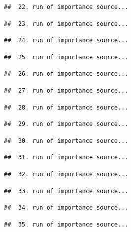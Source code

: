 \documentclass[
]{article}
\begin{document}
\begin{verbatim}
##  22. run of importance source...
\end{verbatim}

\begin{verbatim}
##  23. run of importance source...
\end{verbatim}

\begin{verbatim}
##  24. run of importance source...
\end{verbatim}

\begin{verbatim}
##  25. run of importance source...
\end{verbatim}

\begin{verbatim}
##  26. run of importance source...
\end{verbatim}

\begin{verbatim}
##  27. run of importance source...
\end{verbatim}

\begin{verbatim}
##  28. run of importance source...
\end{verbatim}

\begin{verbatim}
##  29. run of importance source...
\end{verbatim}

\begin{verbatim}
##  30. run of importance source...
\end{verbatim}

\begin{verbatim}
##  31. run of importance source...
\end{verbatim}

\begin{verbatim}
##  32. run of importance source...
\end{verbatim}

\begin{verbatim}
##  33. run of importance source...
\end{verbatim}

\begin{verbatim}
##  34. run of importance source...
\end{verbatim}

\begin{verbatim}
##  35. run of importance source...
\end{verbatim}
\end{document}
